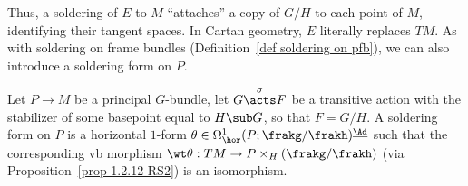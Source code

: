 Thus, a soldering of $E$ to $M$ ``attaches'' a copy of $G\slash H$ to each point of $M$, identifying their tangent spaces. In Cartan geometry, $E$ literally replaces $TM$. As with soldering on frame bundles (Definition~\ref{def soldering on pfb}), we can also introduce a soldering form on $P$.


\begin{defn}
    Let $P\to M$ be a principal $G$-bundle, let $G\overset{\sigma}{\acts}F$ be a transitive action with the stabilizer of some basepoint equal to $H\sub G$, so that $F=G\slash H$. A soldering form on $P$ is a horizontal $1$-form $\theta\in\Omega^1_{\hor}(P;\frakg\slash\frakh)^{\underline{\Ad}}$ such that the corresponding \gls{vb} morphism $\wt\theta:TM\to P\times_H(\frakg\slash\frakh)$ (via Proposition~\ref{prop 1.2.12 RS2}) is an isomorphism.
\end{defn}


